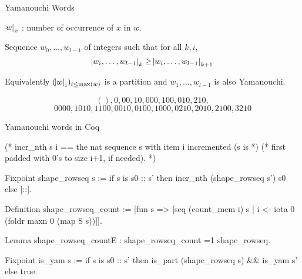 \documentclass[compress,11pt]{beamer}
\begin{document}
\begin{frame}{Yamanouchi Words}

  $\abs{w}_x$ : number of occurrence of $x$ in $w$.

  \begin{DEFN}
    Sequence $w_0,\dots,w_{l-1}$ of integers such that for all $k, i$,
    \[ \abs{w_i,\dots,w_{l-1}}_k \geq \abs{w_i,\dots,w_{l-1}}_{k+1} \]

    Equivalently $(\abs{w}_i)_{i\leq\max(w)}$ is a partition and $w_1,\dots,w_{l-1}$ is
    also Yamanouchi.
  \end{DEFN}

  \[ (), 0, 00, 10, 000, 100, 010, 210, \]
  \[ 0000, 1010, 1100, 0010, 0100, 1000, 0210, 2010, 2100, 3210 \]
\end{frame}

\begin{frame}[fragile]{Yamanouchi words in Coq}
  \begin{coqcode}
(* incr_nth s i == the nat sequence s with item i incremented (s is *)
(*                 first padded with 0's to size i+1, if needed).   *)

  Fixpoint shape_rowseq s :=
    if s is s0 :: s'
    then incr_nth (shape_rowseq s') s0
    else [::].

  Definition shape_rowseq_count :=
    [fun s => [seq (count_mem i) s | i <- iota 0 (foldr maxn 0 (map S s))]].

  Lemma shape_rowseq_countE : shape_rowseq_count =1 shape_rowseq.

  Fixpoint is_yam s :=
    if s is s0 :: s'
    then is_part (shape_rowseq s) && is_yam s'
    else true.
\end{coqcode} 
\end{frame}





\end{document}
